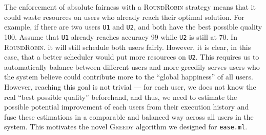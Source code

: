 \documentclass[letterpaper]{vldb}
\newcommand{\eml}{\texttt{ease.ml}\xspace}
\newcommand{\rr}{\textsc{RoundRobin}\xspace}
\newcommand{\greedy}{\textsc{Greedy}\xspace}
\begin{document}
The enforcement of absolute fairness
with a \rr strategy means that it could
waste resources on users who already
reach their optimal solution. For example,
if there are two users \texttt{U1}
and \texttt{U2}, and both have the best
possible quality 100. Assume that \texttt{U1}
already reaches accuracy 99 while 
\texttt{U2} is still at 70. In \rr.
it will still schedule both users
fairly. However, it is clear, in this case,
that a better scheduler would put more
resources on \texttt{U2}. This requires
us to automatically balance between
different users and more greedily
serves users who the system believe
could contribute more to the ``global happiness''
of all users. However, reaching this
goal is not trivial --- for each user,
we does not know the real ``best possible
quality'' beforehand, and thus, we need
to estimate the possible potential
improvement of each users from their
execution history and fuse these
estimations in a comparable and balanced
way across all users in the system.
This motivates
the novel \greedy algorithm we designed for \eml.
\end{document}
